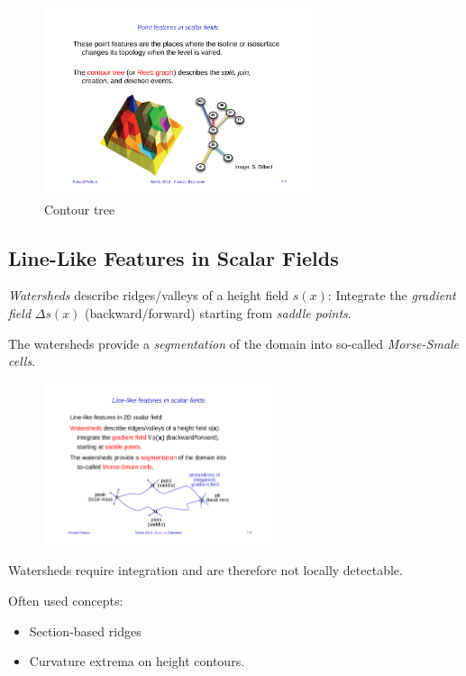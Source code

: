 \begin{figure}[H]
    \centering
    \includegraphics[width=0.7\textwidth]{img/07_contour_tree}
    \caption{Contour tree}
\end{figure}

\subsection{Line-Like Features in Scalar Fields}
\emph{Watersheds} describe ridges/valleys of a height field $s(x)$:
Integrate the \emph{gradient field} $\Delta s(x)$ (backward/forward) starting from \emph{saddle points}.

The watersheds provide a \emph{segmentation} of the domain into so-called \emph{Morse-Smale cells}.
\begin{figure}[H]
\centering
\includegraphics[width=0.6\textwidth]{img/07_watersheds}
\end{figure}

Watersheds require integration and are therefore not locally detectable. 


Often used concepts:
\begin{itemize}
    \item Section-based ridges
    \item Curvature extrema on height contours.
\end{itemize}

